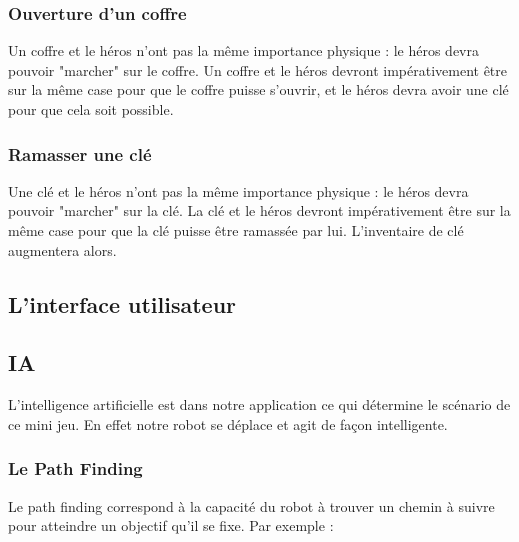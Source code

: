 \documentclass[a4paper 12pts]{article}
\begin{document}
\subsubsection {Ouverture d'un coffre}
Un coffre et le héros n'ont pas la même importance physique : le héros devra pouvoir "marcher" sur le coffre.
Un coffre et le héros devront impérativement être sur la même case pour que le coffre puisse s'ouvrir, et le héros devra avoir une clé pour que cela soit possible.


\vspace{0.75cm}

\subsubsection {Ramasser une clé}

\vspace{0.75cm}
Une clé et le héros n'ont pas la même importance physique : le héros devra pouvoir "marcher" sur la clé.
La clé et le héros devront impérativement être sur la même case pour que la clé puisse être ramassée par lui.
L'inventaire de clé augmentera alors.

\vspace{0.75cm} 
\subsection{L'interface utilisateur}

\newpage

\subsection{IA}

L'intelligence artificielle est dans notre application ce qui détermine le scénario de ce mini jeu.
En effet notre robot se déplace et agit de façon intelligente.
\vspace{0.75cm}

\subsubsection{Le Path Finding}

\vspace{0.75cm}

Le path finding correspond à la capacité du robot à trouver un chemin à suivre pour atteindre un objectif qu'il se fixe.
Par exemple : 

\vspace{0.5cm}
\end{document}
